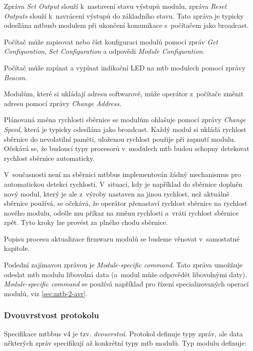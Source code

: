 Zpráva \textit{Set Output} slouží k~nastavení stavu výstupů modulu, zpráva
\textit{Reset Outputs} slouží k~navrácení výstupů do základního stavu.
Tato zpráva je typicky odesílána \gls{mtbusb} modulem při ukončení komunikace
s~počítačem jako broadcast.

Počítač může zapisovat nebo číst konfiguraci modulů pomocí zpráv
\textit{Get Configuration}, \textit{Set Configuration} a odpovědi
\textit{Module Configuration}.

Počítač může zapínat a vypínat indikační LED na \gls{mtb} modulech pomocí
zprávy \textit{Beacon}.

Modulům, které si ukládají adresu softwarově, může operátor z~počítače změnit
adresu pomocí zprávy \textit{Change Address}.

Plánovaná změna rychlosti sběrnice se modulům ohlašuje pomocí zprávy
\textit{Change Speed}, která je typicky odesílána jako broadcast. Každý modul
si ukládá rychlost sběrnice do nevolatilní paměti, uloženou rychlost použije při
zapnutí modulu. Očekává se, že budoucí typy procesorů v~modulech \gls{mtb} budou
schopny detekovat rychlost sběrnice automaticky.

V~současnosti není na sběrnici \gls{mtbbus} implementován žádný mechanismus pro
automatickou detekci rychlosti.  V~situaci, kdy je například do sběrnice
doplněn nový modul, který je ale z~výroby nastaven na jinou rychlost, než
aktuálně sběrnice používá, se očekává, že operátor přenastaví rychlost sběrnice
na rychlost nového modulu, odešle mu příkaz na změnu rychlosti
a~vrátí rychlost sběrnice zpět. Tyto kroky lze provést za plného chodu sběrnice.

Popisu procesu aktualizace firmwaru modulů se budeme věnovat v~samostatné
kapitole.

Poslední zajímavou zprávou je \textit{Module-specific command}. Tato zpráva
umožňuje odeslat \gls{mtb} modulu libovolná data (a~modul může odpovědět
libovolnými daty). \textit{Module-specific command} se používá například pro
řízení specializovaných operací modulů, viz \ref{sec:mtb-2-avr}.


\subsubsection{Dvouvrstvost protokolu}

Specifikace \gls{mtbbus} v4 je tzv. \textit{dvouvrstvá}. Protokol definuje
typy zpráv, ale data některých zpráv specifikují až konkrétní typy \gls{mtb}
modulů. Typ modulu definuje:

